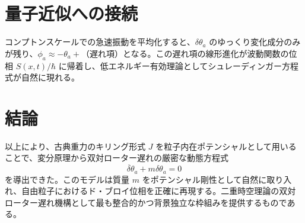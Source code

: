 \documentclass[11pt,a4paper]{article}
\begin{document}
\section{量子近似への接続}

コンプトンスケールでの急速振動を平均化すると、$\delta\theta_a$ のゆっくり変化成分のみが残り、$\phi_a \approx -\theta_a +$（遅れ項）となる。この遅れ項の線形進化が波動関数の位相 $S(x,t)/\hbar$ に帰着し、低エネルギー有効理論としてシュレーディンガー方程式が自然に現れる。

\section{結論}

以上により、古典重力のキリング形式 $J$ を粒子内在ポテンシャルとして用いることで、変分原理から双対ローター遅れの厳密な動態方程式
\[
\ddot{\delta\theta}_a + m \delta\theta_a = 0
\]
を導出できた。このモデルは質量 $m$ をポテンシャル剛性として自然に取り入れ、自由粒子におけるド・ブロイ位相を正確に再現する。二重時空理論の双対ローター遅れ機構として最も整合的かつ背景独立な枠組みを提供するものである。
\end{document}
